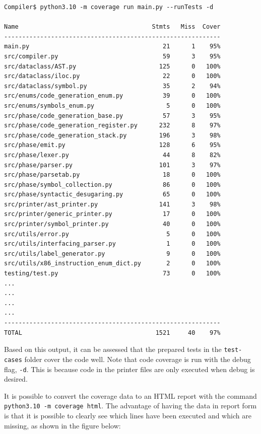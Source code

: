 \begin{verbatim}
Compiler$ python3.10 -m coverage run main.py --runTests -d

Name                                     Stmts   Miss  Cover
------------------------------------------------------------
main.py                                     21      1    95%
src/compiler.py                             59      3    95%
src/dataclass/AST.py                       125      0   100%
src/dataclass/iloc.py                       22      0   100%
src/dataclass/symbol.py                     35      2    94%
src/enums/code_generation_enum.py           39      0   100%
src/enums/symbols_enum.py                    5      0   100%
src/phase/code_generation_base.py           57      3    95%
src/phase/code_generation_register.py      232      8    97%
src/phase/code_generation_stack.py         196      3    98%
src/phase/emit.py                          128      6    95%
src/phase/lexer.py                          44      8    82%
src/phase/parser.py                        101      3    97%
src/phase/parsetab.py                       18      0   100%
src/phase/symbol_collection.py              86      0   100%
src/phase/syntactic_desugaring.py           65      0   100%
src/printer/ast_printer.py                 141      3    98%
src/printer/generic_printer.py              17      0   100%
src/printer/symbol_printer.py               40      0   100%
src/utils/error.py                           5      0   100%
src/utils/interfacing_parser.py              1      0   100%
src/utils/label_generator.py                 9      0   100%
src/utils/x86_instruction_enum_dict.py       2      0   100%
testing/test.py                             73      0   100%
... 
... 
... 
...
------------------------------------------------------------
TOTAL                                     1521     40    97%
\end{verbatim}

Based on this output, it can be assessed that the prepared tests in the \texttt{test-cases} folder cover the code well. Note that code coverage is run with the debug flag, \texttt{-d}. This is because code in the printer files are only executed when debug is desired.

It is possible to convert the coverage data to an HTML report with the command \texttt{python3.10 -m coverage html}. The advantage of having the data in report form is that it is possible to clearly see which lines have been executed and which are missing, as shown in the figure below: 

